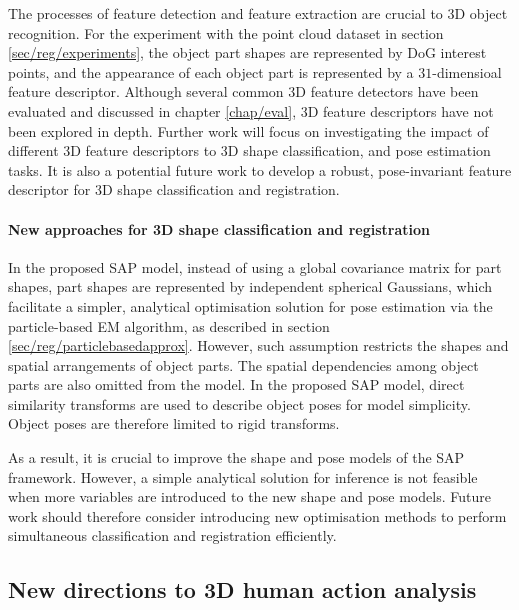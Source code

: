 The processes of feature detection and feature extraction are crucial to 3D object recognition. 
For the experiment with the point cloud dataset in section \ref{sec/reg/experiments}, the object part shapes are represented by DoG interest points, and the appearance of each object part is represented by a $31$-dimensioal feature descriptor.
Although several common 3D feature detectors have been evaluated and discussed in chapter \ref{chap/eval}, 3D feature descriptors have not been explored in depth.
Further work will focus on investigating the impact of different 3D feature descriptors to 3D shape classification, and pose estimation tasks. It is also a potential future work to develop a robust, pose-invariant feature descriptor for 3D shape classification and registration.

\paragraph{New approaches for 3D shape classification and registration}

In the proposed SAP model, instead of using a global covariance matrix for part shapes, part shapes are represented by independent spherical Gaussians, which facilitate a simpler, analytical optimisation solution for pose estimation via the particle-based EM algorithm, as described in section \ref{sec/reg/particlebasedapprox}. 
However, such assumption restricts the shapes and spatial arrangements of object parts. 
The spatial dependencies among object parts are also omitted from the model.  
In the proposed SAP model, direct similarity transforms are used to describe object poses for model simplicity. 
Object poses are therefore limited to rigid transforms.

As a result, it is crucial to improve the shape and pose models of the SAP framework. 
However, a simple analytical solution for inference is not feasible when more variables are introduced to the new shape and pose models. 
Future work should therefore consider introducing new optimisation methods to perform simultaneous classification and registration efficiently.

\subsection{New directions to 3D human action analysis}

